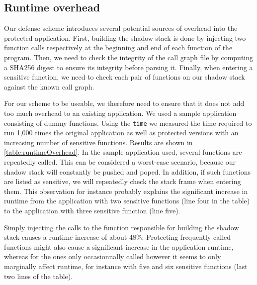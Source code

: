 \documentclass{llncs}
\begin{document}
\subsection{Runtime overhead}
Our defense scheme introduces several potential sources of overhead into the protected application.
First, building the shadow stack is done by injecting two function calls respectively at the beginning and end of each function of the program.
Then, we need to check the integrity of the call graph file by computing a SHA256 digest to ensure its integrity before parsing it.
Finally, when entering a sensitive function, we need to check each pair of functions on our shadow stack against the known call graph.

For our scheme to be useable, we therefore need to ensure that it does not add too much overhead to an existing application.
We used a sample application consisting of dummy functions. Using the \texttt{time} we measured the time required to run 1,000 times the original application as well as protected versions with an increasing number of sensitive functions.
Results are shown in \autoref{table:runtimeOverhead}. In the sample application used, several functions are repeatedly called. This can be considered a worst-case scenario, because our shadow stack will constantly be pushed and poped.
In addition, if such functions are listed as sensitive, we will repeatedly check the stack frame when entering them. This observation for instance probably explains the significant increase in runtime from the application with two sensitive functions (line four in the table) to the application with three sensitive function (line five).

Simply injecting the calls to the function responsible for building the shadow stack causes a runtime increase of about 48\%.
Protecting frequently called functions might also cause a significant increase in the application runtime, whereas for the ones only occasionnally called however it seems to only marginally affect runtime, for instance with five and six sensitive functions (last two lines of the table).

\begin{table}
  \centering {}
  \caption{Runtime overhead with an increasing number of sensitive functions}
  \label{table:runtimeOverhead}
\end{table}
\end{document}
